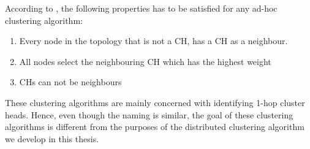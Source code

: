 According to \cite{Basagni} , the following properties has to be satisfied for any ad-hoc clustering algorithm:
\begin{enumerate}
	\item Every node in the topology that is not a CH, has a CH as a neighbour.
	\item All nodes select the neighbouring CH which has the highest weight
	\item CHs can not be neighbours
\end{enumerate}

These clustering algorithms are mainly concerned with identifying 1-hop cluster heads. Hence, even though the naming is similar, the goal of these clustering algorithms is
different from the purposes of the distributed clustering algorithm we develop in this thesis.






